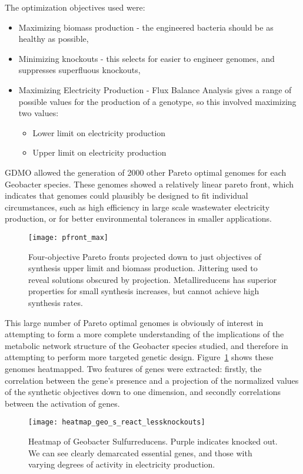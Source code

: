 \documentclass[a4paper,twocolumn]{article}
\begin{document}
The optimization objectives used were:
\begin{itemize}
	\item Maximizing biomass production - the engineered bacteria should be as healthy as possible,
	\item Minimizing knockouts - this selects for easier to engineer genomes, and suppresses superfluous knockouts,
	\item Maximizing Electricity Production - Flux Balance Analysis gives a range of possible values for the production of a genotype, so this involved maximizing two values:
	\begin{itemize}
		\item Lower limit on electricity production
		\item Upper limit on electricity production
	\end{itemize}
\end{itemize}

GDMO allowed the generation of 2000 other Pareto optimal genomes for each Geobacter species. These genomes showed a relatively linear pareto front, which indicates that genomes could plausibly be designed to fit individual circumstances, such as high efficiency in large scale wastewater electricity production, or for better environmental tolerances in smaller applications.

\begin{figure}[h]
\label{fig:heatmap}
\texttt{[image: pfront\_max]}
\caption{Four-objective Pareto fronts projected down to just objectives of synthesis upper limit and biomass production. Jittering used to reveal solutions obscured by projection. Metallireducens has superior properties for small synthesis increases, but cannot achieve high synthesis rates.}
\end{figure}


This large number of Pareto optimal genomes is obviously of interest in attempting to form a more complete understanding of the implications of the metabolic network structure of the Geobacter species studied, and therefore in attempting to perform more targeted genetic design. Figure~\ref{fig:heatmap} shows these genomes heatmapped. Two features of genes were extracted: firstly, the correlation between the gene’s presence and a projection of the normalized values of the synthetic objectives down to one dimension, and secondly correlations between the activation of genes. 

\begin{figure}[h]
\texttt{[image: heatmap\_geo\_s\_react\_lessknockouts]}
\caption{Heatmap of Geobacter Sulfurreducens. Purple indicates knocked out. We can see clearly demarcated essential genes, and those with varying degrees of activity in electricity production.}
\end{figure}
\end{document}

